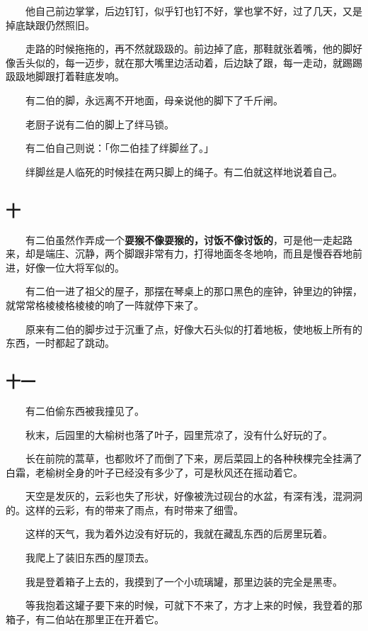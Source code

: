 \documentclass[UTF8]{ctexart}
\begin{document}
　　他自己前边掌掌，后边钉钉，似乎钉也钉不好，掌也掌不好，过了几天，又是掉底缺跟仍然照旧。

　　走路的时候拖拖的，再不然就趿趿的。前边掉了底，那鞋就张着嘴，他的脚好像舌头似的，每一迈步，就在那大嘴里边活动着，后边缺了跟，每一走动，就踢踢趿趿地脚跟打着鞋底发响。

　　有二伯的脚，永远离不开地面，母亲说他的脚下了千斤闸。

　　老厨子说有二伯的脚上了绊马锁。

　　有二伯自己则说：「你二伯挂了绊脚丝了。」

　　绊脚丝是人临死的时候挂在两只脚上的绳子。有二伯就这样地说着自己。

\subsection{十}

　　有二伯虽然作弄成一个\textbf{耍猴不像耍猴的，讨饭不像讨饭的}，可是他一走起路来，却是端庄、沉静，两个脚跟非常有力，打得地面冬冬地响，而且是慢吞吞地前进，好像一位大将军似的。

　　有二伯一进了祖父的屋子，那摆在琴桌上的那口黑色的座钟，钟里边的钟摆，就常常格棱棱格棱棱的响了一阵就停下来了。

　　原来有二伯的脚步过于沉重了点，好像大石头似的打着地板，使地板上所有的东西，一时都起了跳动。

\subsection{十一}

　　有二伯偷东西被我撞见了。

　　秋末，后园里的大榆树也落了叶子，园里荒凉了，没有什么好玩的了。

　　长在前院的蒿草，也都败坏了而倒了下来，房后菜园上的各种秧棵完全挂满了白霜，老榆树全身的叶子已经没有多少了，可是秋风还在摇动着它。

　　天空是发灰的，云彩也失了形状，好像被洗过砚台的水盆，有深有浅，混洞洞的。这样的云彩，有的带来了雨点，有时带来了细雪。

　　这样的天气，我为着外边没有好玩的，我就在藏乱东西的后房里玩着。

　　我爬上了装旧东西的屋顶去。

　　我是登着箱子上去的，我摸到了一个小琉璃罐，那里边装的完全是黑枣。

　　等我抱着这罐子要下来的时候，可就下不来了，方才上来的时候，我登着的那箱子，有二伯站在那里正在开着它。
\end{document}
